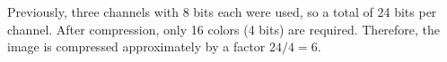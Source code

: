 \begin{answer}
Previously, three channels with 8 bits each were used, so a total of 24 bits per channel.
After compression, only 16 colors (4 bits) are required.
Therefore, the image is compressed approximately by a factor $24/4=6$.
\end{answer}
